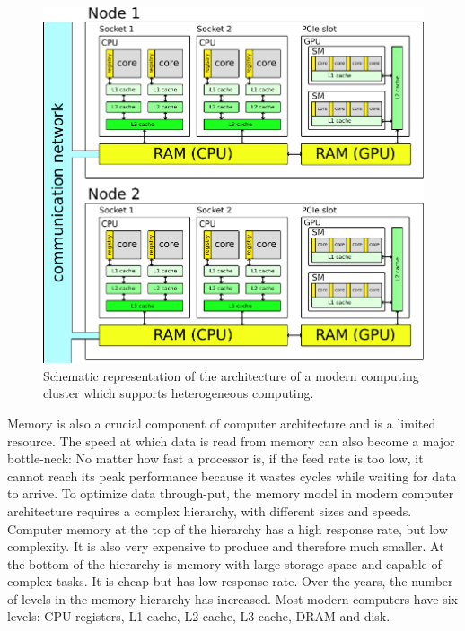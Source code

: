 \begin{figure}
\centering
\includegraphics[scale=1.0]{Pics/memory}
\caption{Schematic representation of the architecture of a modern computing cluster which supports heterogeneous computing.}
\label{clusterArchitecture}
\end{figure}

Memory is also a crucial component of computer architecture and is a limited resource. The speed at which data is read from memory can also become a major bottle-neck: No matter how fast a processor is, if the feed rate is too low, it cannot reach its peak performance because it wastes cycles while waiting for data to arrive. To optimize data through-put, the memory model in modern computer architecture requires a complex hierarchy, with different sizes and speeds. Computer memory at the top of the hierarchy has a high response rate, but low complexity. It is also very expensive to produce and therefore much smaller. At the bottom of the hierarchy is memory with large storage space and capable of complex tasks. It is cheap but has low response rate. Over the years, the number of levels in the memory hierarchy has increased. Most modern computers have six levels: CPU registers, L1 cache, L2 cache, L3 cache, DRAM and disk. 

